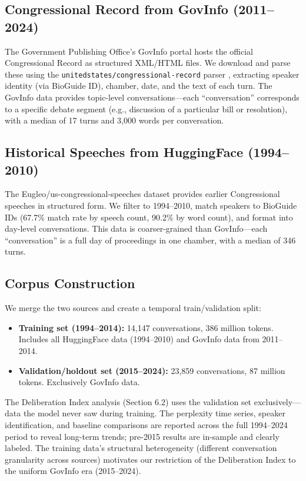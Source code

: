 \documentclass[12pt]{article}
\begin{document}
\subsection{Congressional Record from GovInfo (2011--2024)}

The Government Publishing Office's GovInfo portal \citep{govinfo} hosts the official Congressional Record as structured XML/HTML files. We download and parse these using the \texttt{unitedstates/congressional-record} parser \citep{unitedstates_parser}, extracting speaker identity (via BioGuide ID), chamber, date, and the text of each turn. The GovInfo data provides topic-level conversations---each ``conversation'' corresponds to a specific debate segment (e.g., discussion of a particular bill or resolution), with a median of 17 turns and 3,000 words per conversation.

\subsection{Historical Speeches from HuggingFace (1994--2010)}

The Eugleo/us-congressional-speeches dataset \citep{eugleo2023} provides earlier Congressional speeches in structured form. We filter to 1994--2010, match speakers to BioGuide IDs (67.7\% match rate by speech count, 90.2\% by word count), and format into day-level conversations. This data is coarser-grained than GovInfo---each ``conversation'' is a full day of proceedings in one chamber, with a median of 346 turns.

\subsection{Corpus Construction}

We merge the two sources and create a temporal train/validation split:

\begin{itemize}
    \item \textbf{Training set (1994--2014):} 14,147 conversations, 386 million tokens. Includes all HuggingFace data (1994--2010) and GovInfo data from 2011--2014.
    \item \textbf{Validation/holdout set (2015--2024):} 23,859 conversations, 87 million tokens. Exclusively GovInfo data.
\end{itemize}

\noindent The Deliberation Index analysis (Section 6.2) uses the validation set exclusively---data the model never saw during training. The perplexity time series, speaker identification, and baseline comparisons are reported across the full 1994--2024 period to reveal long-term trends; pre-2015 results are in-sample and clearly labeled. The training data's structural heterogeneity (different conversation granularity across sources) motivates our restriction of the Deliberation Index to the uniform GovInfo era (2015--2024).
\end{document}

